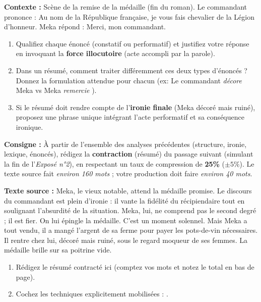 \documentclass[11pt]{article}
\begin{document}
\begin{exercice}
\textbf{Contexte :} Scène de la remise de la médaille (fin du roman). Le commandant prononce : \og Au nom de la République française, je vous fais chevalier de la Légion d'honneur. \fg{} Meka répond : \og Merci, mon commandant. \fg{}

\begin{enumerate}
    \item Qualifiez chaque énoncé (constatif ou performatif) et justifiez votre réponse en invoquant la \textbf{force illocutoire} (acte accompli par la parole).
    \item Dans un résumé, comment traiter différemment ces deux types d'énoncés ? Donnez la formulation attendue pour chacun (ex: \og Le commandant \textit{décore} Meka \fg{} vs \og Meka \textit{remercie} \fg{}).
    \item Si le résumé doit rendre compte de l'\textbf{ironie finale} (Meka décoré mais ruiné), proposez une phrase unique intégrant l'acte performatif et sa conséquence ironique.
\end{enumerate}
\end{exercice}

\begin{exercice}
\textbf{Consigne :} À partir de l'ensemble des analyses précédentes (structure, ironie, lexique, énoncés), rédigez la \textbf{contraction} (résumé) du passage suivant (simulant la fin de l'\textit{Exposé n°2}), en respectant un taux de compression de \textbf{25\%} ($\pm 5\%$). Le texte source fait \textit{environ 160 mots} ; votre production doit faire \textit{environ 40 mots}.

\textbf{Texte source :}
\og Meka, le vieux notable, attend la médaille promise. Le discours du commandant est plein d'ironie : il vante la fidélité du récipiendaire tout en soulignant l'absurdité de la situation. Meka, lui, ne comprend pas le second degré ; il est fier. On lui épingle la médaille. C'est un moment solennel. Mais Meka a tout vendu, il a \og mangé l'argent \fg{} de sa ferme pour payer les pots-de-vin nécessaires. Il rentre chez lui, décoré mais ruiné, sous le regard moqueur de ses femmes. La médaille brille sur sa poitrine vide. \fg{}

\begin{enumerate}
    \item Rédigez le résumé contracté ici (comptez vos mots et notez le total en bas de page).
    \item Cochez les techniques explicitement mobilisées :     .
\end{enumerate}
\end{exercice}
\end{document}
